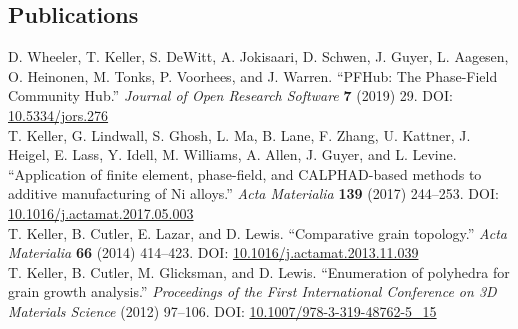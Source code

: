 \documentclass[margin]{res}
\begin{document}
\begin{resume}
\section{Publications}
D. Wheeler, T. Keller, S. DeWitt, A. Jokisaari, D. Schwen, J. Guyer, L. Aagesen, O. Heinonen, M. Tonks, P. Voorhees, and J. Warren.
 ``PFHub: The Phase-Field Community Hub.''
 \emph{Journal of Open Research Software} {\bf 7} (2019) 29. DOI: \href{https://doi.org/10.5334/jors.276}{10.5334/jors.276}\\[0.25\baselineskip]
T. Keller, G. Lindwall, S. Ghosh, L. Ma, B. Lane, F. Zhang, U. Kattner, J. Heigel, E. Lass, Y. Idell, M. Williams, A. Allen, J. Guyer, and L. Levine.
 ``Application of finite element, phase-field, and CALPHAD-based methods to additive manufacturing of Ni alloys.''
 \emph{Acta Materialia} {\bf 139} (2017) 244--253. DOI: \href{https://doi.org/10.1016/j.actamat.2017.05.003}{10.1016/j.actamat.2017.05.003}\\[0.25\baselineskip]
T. Keller, B. Cutler, E. Lazar, and D. Lewis. ``Comparative grain topology.''
 \emph{Acta Materialia} {\bf 66} (2014) 414--423. DOI: \href{https://doi.org/10.1016/j.actamat.2013.11.039}{10.1016/j.actamat.2013.11.039}\\[0.25\baselineskip]
T. Keller, B. Cutler, M. Glicksman, and D. Lewis. ``Enumeration of polyhedra for grain growth analysis.''
 \emph{Proceedings of the First International Conference on 3D Materials Science} (2012) 97--106. DOI: \href{https://doi.org/10.1007/978-3-319-48762-5_15}{10.1007/978-3-319-48762-5\_15}\\[0.25\baselineskip]

\end{resume}
\end{document}

